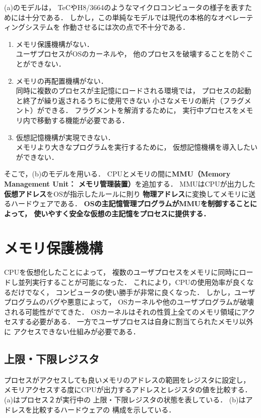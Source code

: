 (a)のモデルは，
TeCやH8/3664のようなマイクロコンピュータの様子を表すためには十分である．
しかし，この単純なモデルでは現代の本格的なオペレーティングシステムを
作動させるには次の点で不十分である．
\begin{enumerate}
\item メモリ保護機構がない．\\
ユーザプロセスがOSのカーネルや，
他のプロセスを破壊することを防ぐことができない．
\item メモリの再配置機構がない．\\
同時に複数のプロセスが主記憶にロードされる環境では，
プロセスの起動と終了が繰り返されるうちに使用できない
小さなメモリの断片（フラグメント）ができる．
フラグメントを解消するために，
実行中プロセスをメモリ内で移動する機能が必要である．
\item 仮想記憶機構が実現できない．\\
メモリより大きなプログラムを実行するために，
仮想記憶機構を導入したいができない．
\end{enumerate}

そこで，(b)のモデルを用いる．
CPUとメモリの間に{\bf MMU（Memory Management Unit：
メモリ管理装置）}を追加する．
MMUはCPUが出力した{\bf 仮想アドレス}をOSが指示したルールに則り
{\bf 物理アドレス}に変換してメモリに送るハードウェアである．
{\bf OSの主記憶管理プログラムがMMUを制御することによって，
使いやすく安全な仮想の主記憶をプロセスに提供する．}

\section{メモリ保護機構}
CPUを仮想化したことによって，
複数のユーザプロセスをメモリに同時にロードし並列実行することが可能になった．
これにより，CPUの使用効率が良くなるだけでなく，
コンピュータの使い勝手が非常に良くなった．
しかし，ユーザプログラムのバグや悪意によって，
OSカーネルや他のユーザプログラムが破壊される可能性がでてきた．
OSカーネルはそれの性質上全てのメモリ領域にアクセスする必要がある．
一方でユーザプロセスは自身に割当てられたメモリ以外に
アクセスできない仕組みが必要である．

\subsection{上限・下限レジスタ}
プロセスがアクセスしても良いメモリのアドレスの範囲をレジスタに設定し，
メモリアクセスする度にCPUが出力するアドレスとレジスタの値を比較する．
(a)はプロセス２が実行中の
上限・下限レジスタの状態を表している．
(b)はアドレスを比較するハードウェアの
構成を示している．

